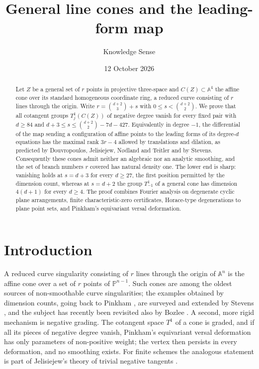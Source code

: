 \documentclass{amsart}
\theoremstyle{definition}
\theoremstyle{remark}
\numberwithin{equation}{section}
\newcommand{\PP}{\mathbb{P}}
\newcommand{\A}{\mathbb{A}}
\begin{document}
\title{General line cones and the leading-form map}
\author{Knowledge Sense}
\address{Knowledge Sense}
\date{12 October 2026}

\begin{abstract}
Let $Z$ be a general set of $r$ points in projective three-space and $C(Z)\subset\A^4$ the
affine cone over its standard homogeneous coordinate ring, a reduced curve consisting of
$r$ lines through the origin. Write $r=\binom{d+2}3+s$ with $0\le s<\binom{d+2}2$. We prove
that all cotangent groups $T^1_j(C(Z))$ of negative degree vanish for every fixed pair
with $d\ge84$ and $d+3\le s\le\binom{d+2}2-7d-427$. Equivalently in degree $-1$, the
differential of the map sending a configuration of affine points to the leading forms of
its degree-$d$ equations has the maximal rank $3r-4$ allowed by translations and dilation,
as predicted by Douvropoulos, Jelisiejew, N\o dland and Teitler and by Stevens.
Consequently these cones admit neither an algebraic nor an analytic smoothing, and the set
of branch numbers $r$ covered has natural density one. The lower end is sharp: vanishing
holds at $s=d+3$ for every $d\ge27$, the first position permitted by the dimension count,
whereas at $s=d+2$ the group $T^1_{-1}$ of a general cone has dimension $4(d+1)$ for every
$d\ge4$. The proof combines Fourier analysis on degenerate cyclic plane arrangements,
finite characteristic-zero certificates, Horace-type degenerations to plane point sets, and
Pinkham's equivariant versal deformation.
\end{abstract}

\maketitle

\section{Introduction}

A reduced curve singularity consisting of $r$ lines through the origin of $\A^n$ is the
affine cone over a set of $r$ points of $\PP^{n-1}$. Such cones are among the oldest
sources of non-smoothable curve singularities; the examples obtained by dimension counts,
going back to Pinkham \cite{Pinkham}, are surveyed and extended by Stevens
\cite[Sections~3.1--3.2]{Stevens}, and the subject has recently been revisited also by
Bozlee \cite{Bozlee}. A
second, more rigid mechanism is negative grading. The cotangent space $T^1$ of a cone is
graded, and if all its pieces of negative degree vanish, Pinkham's equivariant versal
deformation has only parameters of non-positive weight; the vertex then persists in every
deformation, and no smoothing exists. For finite schemes the analogous statement is part of
Jelisiejew's theory of trivial negative tangents \cite[Theorem~1.2]{JelElem}.
\end{document}
